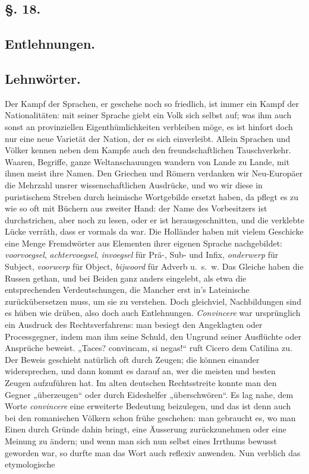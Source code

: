 {
\subsection*{§. 18.}\label{III.II.II.18}
\subsection*{Entlehnungen.}
\subsection*{Lehnwörter.}
Der Kampf der Sprachen, er geschehe noch so friedlich, ist immer ein Kampf der Nationalitäten: mit seiner Sprache giebt ein Volk sich selbst auf; was ihm auch sonst an provinziellen Eigenthümlichkeiten verbleiben möge, es ist hinfort doch nur eine neue Varietät der Nation, der es sich einverleibt. Allein Sprachen und Völker kennen neben dem Kampfe auch den freundschaftlichen Tauschverkehr. Waaren, Begriffe, ganze Weltanschauungen wandern von Lande zu Lande, mit ihnen meist ihre Namen. Den Griechen und Römern verdanken wir Neu-Europäer die Mehrzahl unsrer wissenschaftlichen Ausdrücke, und wo wir diese in puristischem Streben durch heimische Wortgebilde ersetzt haben, da pflegt es zu  wie so oft mit Büchern aus zweiter Hand: der Name des Vorbesitzers ist durchstrichen, aber noch zu lesen, oder er ist herausgeschnitten, und die verklebte Lücke verräth, dass er vormals da war. Die Holländer haben mit vielem Geschicke eine Menge Fremdwörter aus Elementen \label{sp.263} ihrer eigenen Sprache nachgebildet: \textit{voorvoegsel}, \textit{achtervoegsel}, \label{fp.258} \textit{invoegsel} für Prä-, Sub- und Infix, \textit{onderwerp} für Subject, \textit{voorwerp} für Object, \textit{bijwoord} für Adverb u.~s.~w. Das Gleiche haben die Russen gethan, und bei Beiden  ganz anders eingelebt, als etwa die entsprechenden Verdeutschungen, die Mancher erst in’s Lateinische zurückübersetzen muss, um sie zu verstehen. Doch gleichviel, Nachbildungen sind es hüben wie drüben, also doch auch Entlehnungen. \textit{Convincere} war ursprünglich ein Ausdruck des Rechtsverfahrens: man besiegt den Angeklagten oder Processgegner, indem man ihm seine Schuld, den Ungrund seiner Ausflüchte oder Ansprüche beweist. „Taces? convincam, si negas!“ ruft Cicero dem Catilina zu. Der Beweis geschieht natürlich oft durch Zeugen; die können einander widersprechen, und dann kommt es darauf an, wer die meisten und besten Zeugen aufzuführen hat. Im alten deutschen Rechtsstreite konnte man den Gegner „überzeugen“ oder durch Eideshelfer „überschwören“. Es lag nahe, dem Worte \textit{convincere} eine erweiterte Bedeutung beizulegen, und das ist denn auch bei den romanischen Völkern schon frühe geschehen: man gebraucht es, wo man Einen durch Gründe dahin bringt, eine Äusserung zurückzunehmen oder eine Meinung zu ändern; und wenn man sich nun selbst eines Irrthums bewusst geworden war, so durfte man das Wort auch reflexiv anwenden. Nun verblich das etymologische }
